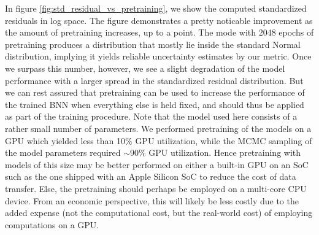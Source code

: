In figure \ref{fig:std_residual_vs_pretraining}, we
show the computed standardized residuals in log space. The figure demonstrates a pretty noticable improvement as the amount of pretraining increases, up to a point. The mode with 2048 epochs of pretraining produces a distribution that mostly lie inside the standard Normal distribution, implying it yields reliable uncertainty estimates by our metric. Once we surpass this number, however, we see a slight degradation of the model performance with a larger spread in the standardized residual distribution. But we can rest assured that pretraining can be used to increase the performance of the trained BNN when everything else is held fixed, and should thus be applied as part of the training procedure. Note that the model used here consists of a rather small number of parameters. We performed pretraining of the models on a GPU which yielded less than 10\% GPU utilization, while the MCMC sampling of the model parameters required $\sim 90\%$ GPU utilization. Hence pretraining with models of this size may be better performed on either a built-in GPU on an SoC such as the one shipped with an Apple Silicon SoC to reduce the cost of data transfer. Else, the pretraining should perhaps be employed on a multi-core CPU device. From an economic perspective, this will likely be less costly due to the added expense (not the computational cost, but the real-world cost) of employing computations on a GPU.
